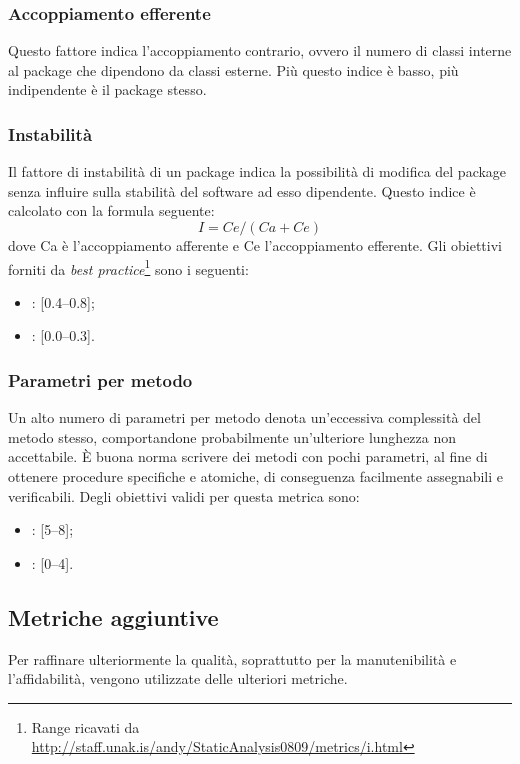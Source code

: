 \subsubsection{Accoppiamento efferente}
Questo fattore indica l'accoppiamento contrario, ovvero il numero di classi interne al package che dipendono da classi esterne. Più questo indice è basso, più indipendente è il package stesso.

\subsubsection{Instabilità}
\label{4.2.8}
Il fattore di instabilità di un package indica la possibilità di modifica del package senza influire sulla stabilità del software ad esso dipendente.
Questo indice è calcolato con la formula seguente:
$$I = Ce / (Ca + Ce)$$
dove Ca è l'accoppiamento afferente e Ce l'accoppiamento efferente.
Gli obiettivi forniti da \emph{best practice}\footnote{Range ricavati da \url{http://staff.unak.is/andy/StaticAnalysis0809/metrics/i.html}} sono i seguenti:
\begin{itemize}
\item {}: [0.4--0.8];
\item {}: [0.0--0.3].
\end{itemize}

\subsubsection{Parametri per metodo}
Un alto numero di parametri per metodo denota un'eccessiva complessità del metodo stesso, comportandone probabilmente un'ulteriore lunghezza non accettabile. \`{E} buona norma scrivere dei metodi con pochi parametri, al fine di ottenere procedure specifiche e atomiche, di conseguenza facilmente assegnabili e verificabili.
Degli obiettivi validi per questa metrica sono:
\begin{itemize}
\item {}: [5--8];
\item {}: [0--4].
\end{itemize}

\subsection{Metriche aggiuntive}
Per raffinare ulteriormente la qualità, soprattutto per la manutenibilità e l'affidabilità, vengono utilizzate delle ulteriori metriche.

